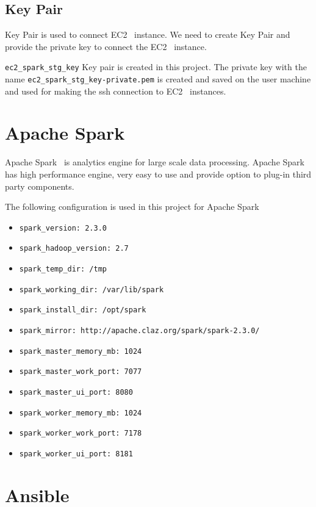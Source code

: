 \subsection{Key Pair}

Key Pair is used to connect EC2~\cite{hid-sp18-511-www-ec2}
instance. We need to create Key Pair and provide the private key to
connect the EC2~\cite{hid-sp18-511-www-ec2} instance.

\verb|ec2_spark_stg_key| Key pair is created in this project.
The private key with the name \verb|ec2_spark_stg_key-private.pem| is
created and saved on the user machine and used for making the ssh connection to
EC2~\cite{hid-sp18-511-www-ec2} instances.

\section{Apache Spark}

Apache Spark~\cite{hid-sp18-511-www-spark} is analytics engine for
large scale data processing. Apache
Spark~\cite{hid-sp18-511-www-spark} has high performance engine, very
easy to use and provide option to plug-in third party components.

The following configuration is used in this project for Apache Spark

\begin{itemize}
	\item \verb|spark_version: 2.3.0|
	\item \verb|spark_hadoop_version: 2.7|
	\item \verb|spark_temp_dir: /tmp|
	\item \verb|spark_working_dir: /var/lib/spark|
	\item \verb|spark_install_dir: /opt/spark|
	\item \verb|spark_mirror: http://apache.claz.org/spark/spark-2.3.0/|
	\item \verb|spark_master_memory_mb: 1024|
	\item \verb|spark_master_work_port: 7077|
	\item \verb|spark_master_ui_port: 8080|
	\item \verb|spark_worker_memory_mb: 1024|
	\item \verb|spark_worker_work_port: 7178|
	\item \verb|spark_worker_ui_port: 8181|
\end{itemize}

\section{Ansible}

